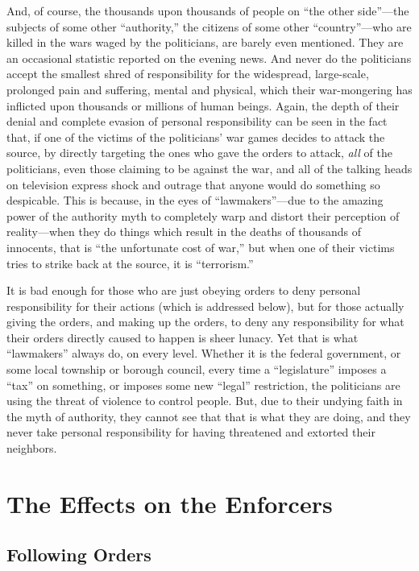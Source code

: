 \documentclass{book}
\begin{document}
And, of course, the thousands upon thousands of people on \enquote{the other side}---the subjects of some other \enquote{authority,} the citizens of some other \enquote{country}---who are killed in the wars waged by the politicians, are barely even mentioned. They are an occasional statistic reported on the evening news. And never do the politicians accept the smallest shred of responsibility for the widespread, large-scale, prolonged pain and suffering, mental and physical, which their war-mongering has inflicted upon thousands or millions of human beings. Again, the depth of their denial and complete evasion of personal responsibility can be seen in the fact that, if one of the victims of the politicians' war games decides to attack the source, by directly targeting the ones who gave the orders to attack, \emph{all} of the politicians, even those claiming to be against the war, and all of the talking heads on television express shock and outrage that anyone would do something so despicable. This is because, in the eyes of \enquote{lawmakers}---due to the amazing power of the authority myth to completely warp and distort their perception of reality---when they do things which result in the deaths of thousands of innocents, that is \enquote{the unfortunate cost of war,} but when one of their victims tries to strike back at the source, it is \enquote{terrorism.}

It is bad enough for those who are just obeying orders to deny personal responsibility for their actions (which is addressed below), but for those actually giving the orders, and making up the orders, to deny any responsibility for what their orders directly caused to happen is sheer lunacy. Yet that is what \enquote{lawmakers} always do, on every level. Whether it is the federal government, or some local township or borough council, every time a \enquote{legislature} imposes a \enquote{tax} on something, or imposes some new \enquote{legal} restriction, the politicians are using the threat of violence to control people. But, due to their undying faith in the myth of authority, they cannot see that that is what they are doing, and they never take personal responsibility for having threatened and extorted their neighbors.

\chapter{The Effects on the Enforcers}

\section{Following Orders}
\end{document}

